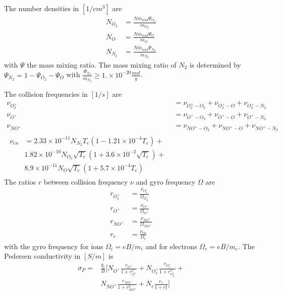 The number densities in $[1/cm^3]$ are
%
\begin{align}
  N_{O_2} &= \frac{N \overline{m}_{mid} \Psi_{O_2}}{m_{O_2}} \\
  N_{O}   &= \frac{N \overline{m}_{mid} \Psi_{O}}{m_{O}} \\
  N_{N_2} &= \frac{N \overline{m}_{mid} \Psi_{N_2}}{m_{N_2}}
\end{align}
%
with $\Psi$ the mass mixing ratio. The mass mixing ratio of $N_2$
is determined by $\Psi_{N_2}= 1 - \Psi_{O_2}-\Psi_{O}$ with
$\frac{\Psi_{N_2}}{m_{N_2}} \geq 1. \times 10^{-20} \frac{mol}{g}$.

The collision frequencies in $[1/s]$ are
%
\begin{align}
  \nu_{O_2^+} &= \nu_{O_2^+ - O_2} + \nu_{O_2^+ - O} +
  \nu_{O_2^+ - N_2}  \\
  \nu_{O^+}   &= \nu_{O^+ - O_2} + \nu_{O^+ - O} +
  \nu_{O^+ - N_2}  \\
  \nu_{NO^+}  &= \nu_{NO^+ - O_2} + \nu_{NO^+ - O} +
  \nu_{NO^+ - N_2}  \\
  \begin{split}
  \nu_{en}   &= 2.33\times10^{-11} N_{N_2} T_e (1-1.21 \times 10^{-4}
  T_e) + \\
   & 1.82 \times 10^{-10} N_{O_2} \sqrt{T_e} (1 + 3.6 \times 10^{-2}
  \sqrt{T_e}) + \\
   & 8.9 \times 10^{-11} N_O \sqrt{T_e} (1 + 5.7 \times 10^{-4} T_e)
  \end{split}
\end{align}
%
The ratios $r$ between collision frequency $\nu$ and gyro frequency
$\Omega$ are
%
\begin{align}
  r_{O_2^+} &= \frac{\nu_{O_2^+}}{\Omega_{O_2^+}}\\
  r_{O^+}   &= \frac{\nu_{O^+}}{\Omega_{O^+}}\\
  r_{NO^+}  &= \frac{\nu_{NO^+}}{\Omega_{NO^+}}\\
  r_{e}     &= \frac{\nu_{en}}{\Omega_{e}}
\end{align}
%
with the gyro frequency for ions $\Omega_i = e B/m_i$ and for
electrons $\Omega_e=eB/m_e$.
%
The Pedersen conductivity in $[ S/m]$ is
%
\begin{equation}
  \begin{split}
   \sigma_P = &\frac{q_e}{B} [ N_{O^+} \frac{r_{O^+}}
      {1+r_{O^+}^2 } +
       N_{O_2^+} \frac{r_{O_2^+}}
      {1+r_{O_2^+}^2 } + \\
       & N_{NO^+} \frac{r_{NO^+}}
      {1+r_{NO^+}^2 } +
       N_{e} \frac{r_e}
      {1+r_e^2 } ]
  \end{split}
\end{equation}
